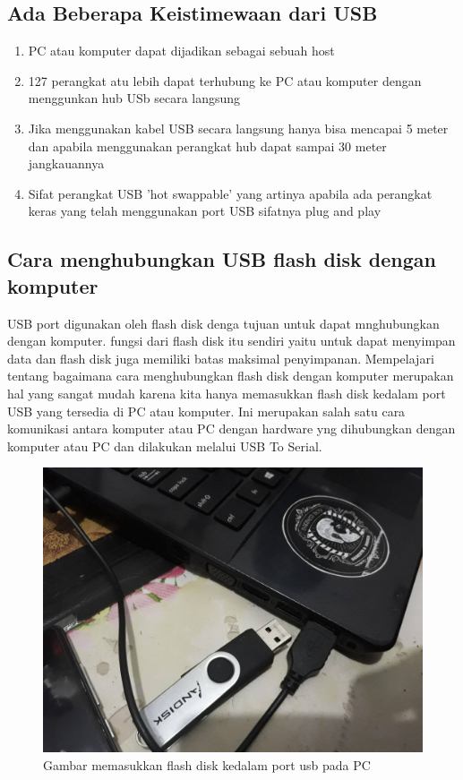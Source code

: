 \begin {enumerate}
\subsection {Ada Beberapa Keistimewaan dari USB}
\begin {enumerate}
\item
 PC atau komputer dapat dijadikan sebagai sebuah host
\item
 127 perangkat atu lebih dapat terhubung ke PC atau komputer dengan menggunkan hub USb secara langsung
\item
 Jika menggunakan kabel USB secara langsung hanya bisa mencapai 5 meter dan apabila menggunakan perangkat hub dapat sampai 30 meter jangkauannya
\item
 Sifat perangkat USB 'hot swappable' yang artinya apabila ada perangkat keras yang telah menggunakan port USB sifatnya plug and play
\end {enumerate}	

\subsection {Cara menghubungkan USB flash disk dengan komputer}
	USB port digunakan oleh flash disk denga tujuan untuk dapat mnghubungkan dengan komputer. fungsi dari flash disk itu sendiri yaitu untuk dapat menyimpan data dan flash disk juga memiliki batas maksimal penyimpanan. Mempelajari tentang bagaimana cara menghubungkan flash disk dengan komputer merupakan hal yang sangat mudah karena kita hanya memasukkan flash disk kedalam port USB yang tersedia di PC atau komputer. Ini merupakan salah satu cara komunikasi antara komputer atau PC dengan hardware yng dihubungkan dengan komputer atau PC dan dilakukan melalui USB To Serial.
	
	\begin{figure}[ht]
	\centerline{\includegraphics[width=1\textwidth]{figures/usb1.jpg}}
	\caption{Gambar memasukkan flash disk kedalam port usb pada PC}
	\label{Gambar}
	\end{figure}
      

\end{enumerate}
